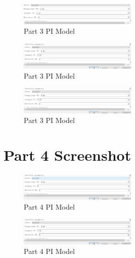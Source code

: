 \documentclass[11pt, a4paper]{article}
\begin{document}
\begin{figure}[htbp]     \begin{centering}
    \includegraphics[width=0.5\textwidth]{a3_2_1.png}
    \caption{Part 3 PI Model}
    \end{centering}
\end{figure}

\begin{figure}[htbp]     \begin{centering}
    \includegraphics[width=0.5\textwidth]{a3_2_2.png}
    \caption{Part 3 PI Model}
    \end{centering}
\end{figure}

\begin{figure}[htbp]     \begin{centering}
    \includegraphics[width=0.5\textwidth]{a3_2_3.png}
    \caption{Part 3 PI Model}
    \end{centering}
\end{figure}

\newpage

\section{Part 4 Screenshot}

\begin{figure}[htbp]     \begin{centering}
    \includegraphics[width=0.5\textwidth]{a4_1.png}
    \caption{Part 4 PI Model}
    \end{centering}
\end{figure}

\begin{figure}[htbp]     \begin{centering}
    \includegraphics[width=0.5\textwidth]{a4_2.png}
    \caption{Part 4 PI Model}
    \end{centering}
\end{figure}
\end{document}
